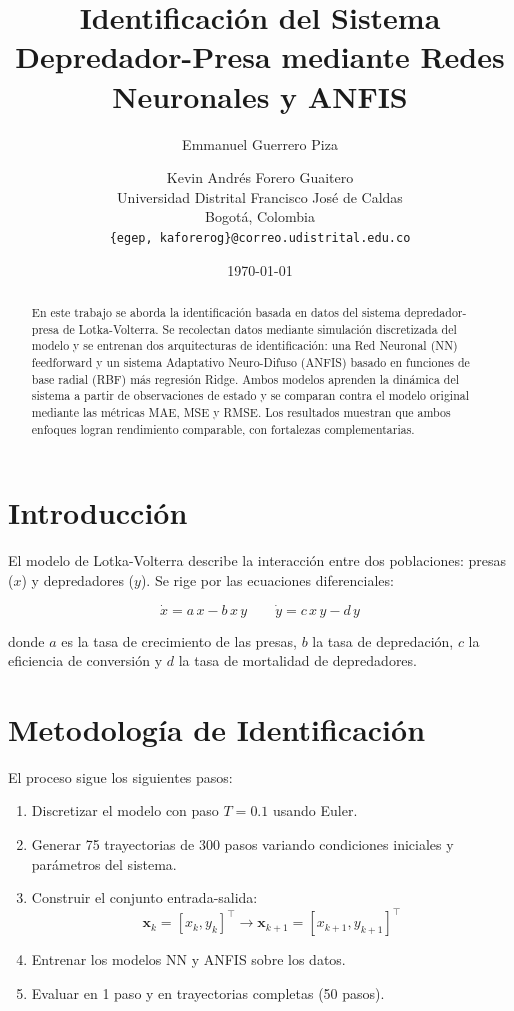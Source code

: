 \documentclass[twocolumn]{article}
\title{Identificación del Sistema Depredador-Presa mediante Redes Neuronales y ANFIS}
\author{Emmanuel Guerrero Piza \and Kevin Andrés Forero Guaitero \\
  \small Universidad Distrital Francisco José de Caldas \\
  \small Bogotá, Colombia \\
  \small \texttt{\{egep, kaforerog\}@correo.udistrital.edu.co}
}
\date{\today}
\begin{document}
\maketitle

\begin{abstract}
En este trabajo se aborda la identificación basada en datos del sistema
depredador-presa de Lotka-Volterra. Se recolectan datos mediante simulación
discretizada del modelo y se entrenan dos arquitecturas de identificación:
una Red Neuronal (NN) feedforward y un sistema Adaptativo Neuro-Difuso
(ANFIS) basado en funciones de base radial (RBF) más regresión Ridge.
Ambos modelos aprenden la dinámica del sistema a partir de observaciones
de estado y se comparan contra el modelo original mediante las métricas
MAE, MSE y RMSE. Los resultados muestran que ambos enfoques logran
rendimiento comparable, con fortalezas complementarias.
\end{abstract}

\section{Introducción}

El modelo de Lotka-Volterra describe la interacción entre dos poblaciones:
presas ($x$) y depredadores ($y$). Se rige por las ecuaciones diferenciales:

\begin{equation}
\dot{x} = a\,x - b\,x\,y \qquad
\dot{y} = c\,x\,y - d\,y
\end{equation}

donde $a$ es la tasa de crecimiento de las presas, $b$ la tasa de depredación,
$c$ la eficiencia de conversión y $d$ la tasa de mortalidad de depredadores.

\section{Metodología de Identificación}

El proceso sigue los siguientes pasos:

\begin{enumerate}
  \item Discretizar el modelo con paso $T=0.1$ usando Euler.
  \item Generar 75 trayectorias de 300 pasos variando condiciones iniciales
        y parámetros del sistema.
  \item Construir el conjunto entrada-salida:
        \[
        \mathbf{x}_k = [x_k, y_k]^\top \to \mathbf{x}_{k+1} = [x_{k+1}, y_{k+1}]^\top
        \]
  \item Entrenar los modelos NN y ANFIS sobre los datos.
  \item Evaluar en 1 paso y en trayectorias completas (50 pasos).
\end{enumerate}
\end{document}
